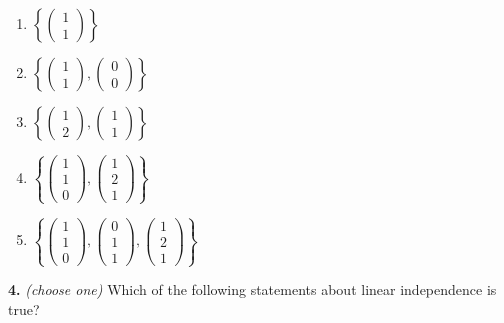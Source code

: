 \documentclass[10pt,a4paper]{article}
\begin{document}
\begin{enumerate}[label=(\Alph*)]
\item \(\left\{\begin{pmatrix}1\\1\end{pmatrix}\right\}\)
\item \(\left\{\begin{pmatrix}1\\1\end{pmatrix},\begin{pmatrix}0\\0\end{pmatrix}\right\}\)
\item \(\left\{\begin{pmatrix}1\\2\end{pmatrix},\begin{pmatrix}1\\1\end{pmatrix}\right\}\)
\item \(\left\{\begin{pmatrix}1\\1\\0\end{pmatrix},\begin{pmatrix}1\\2\\1\end{pmatrix}\right\}\)
\item \(\left\{\begin{pmatrix}1\\1\\0\end{pmatrix},\begin{pmatrix}0\\1\\1\end{pmatrix},\begin{pmatrix}1\\2\\1\end{pmatrix}\right\}\)
\end{enumerate}
\smallskip
\textbf{4.} \textit{(choose one)} Which of the following statements about linear independence is true?
\end{document}

